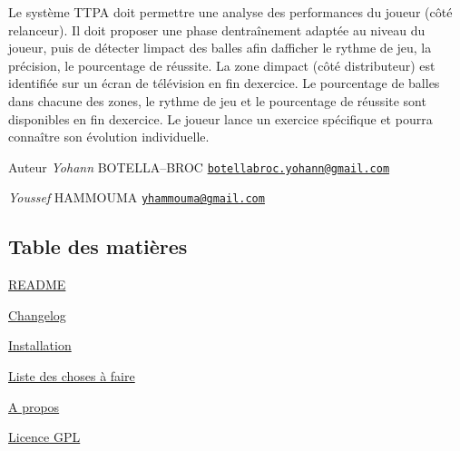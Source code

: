Le système T\+T\+PA doit permettre une analyse des performances du joueur (côté relanceur). Il doit proposer une phase d\textquotesingle{}entraînement adaptée au niveau du joueur, puis de détecter l\textquotesingle{}impact des balles afin d\textquotesingle{}afficher le rythme de jeu, la précision, le pourcentage de réussite. La zone d\textquotesingle{}impact (côté distributeur) est identifiée sur un écran de télévision en fin d\textquotesingle{}exercice. Le pourcentage de balles dans chacune des zones, le rythme de jeu et le pourcentage de réussite sont disponibles en fin d\textquotesingle{}exercice. Le joueur lance un exercice spécifique et pourra connaître son évolution individuelle.

\begin{DoxyAuthor}{Auteur}
{\itshape Yohann} B\+O\+T\+E\+L\+LA--B\+R\+OC \href{mailto:botellabroc.yohann@gmail.com}{\tt botellabroc.\+yohann@gmail.\+com}

{\itshape Youssef} H\+A\+M\+M\+O\+U\+MA \href{mailto:yhammouma@gmail.com}{\tt yhammouma@gmail.\+com}
\end{DoxyAuthor}
\hypertarget{index_section_tdm}{}\subsection{Table des matières}\label{index_section_tdm}

\begin{DoxyItemize}
\item \hyperlink{page__r_e_a_d_m_e}{R\+E\+A\+D\+ME}
\item \hyperlink{page_changelog}{Changelog}
\item \hyperlink{page_install}{Installation}
\item \hyperlink{todo}{Liste des choses à faire}
\item \hyperlink{page_about}{A propos}
\item \hyperlink{page_licence}{Licence G\+PL} 
\end{DoxyItemize}